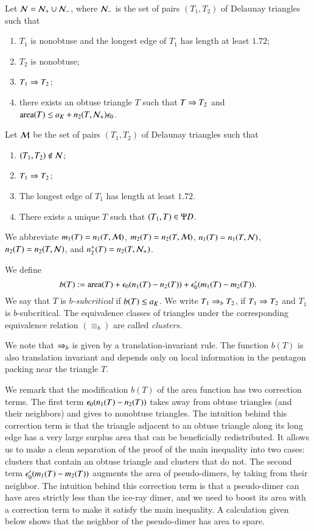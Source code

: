 Let $\mathcal N = \mathcal N_+ \cup \mathcal N_-$, where $\mathcal N_-$ is the set of pairs $(T_1,T_2)$ of Delaunay triangles such that
\begin{enumerate}
\item $T_1$ is nonobtuse and the longest edge of $T_1$ has length at least $1.72$;
\item $T_2$ is nonobtuse;
\item $T_1\Rightarrow T_2$;
\item there exists an obtuse triangle $T$ such that $T\Rightarrow T_2$ and 
${\operatorname{area}}(T) \le a_K+  n_2(T,\mathcal N_+)\epsilon_0$.
\end{enumerate}

Let $\mathcal M$ be the set of pairs $(T_1,T_2)$ of Delaunay triangles such that
\begin{enumerate}
\item $(T_1,T_2)\not\in \mathcal N$;
\item $T_1\Rightarrow T_2$;
\item The longest edge of $T_1$ has length  at least $1.72$.
\item There exists a unique $T$ such that $(T_1,T)\in \Psi D$.
\end{enumerate}

We abbreviate $m_1(T) = n_1(T,\mathcal M)$, $m_2(T) = n_2(T,\mathcal M)$, $n_1(T) = n_1(T,\mathcal N)$, $n_2(T) = n_2(T,\mathcal N)$,
and $n_2^+(T) = n_2(T,\mathcal N_+)$.

We define
\[
b(T) := {\operatorname{area}}(T) + \epsilon_0 (n_1(T) - n_2(T)) + \epsilon_0' (m_1(T) - m_2(T)).
\]
We say that $T$ is {\it $b$-subcritical} if $b(T) \le a_K$.  We write
$T_1\Rightarrow_{b} T_2$, if $T_1\Rightarrow T_2$ and $T_1$ is $b$-subcritical.
The equivalence classes of triangles under the corresponding
equivalence relation $(\equiv_b)$ are called {\it clusters}.

We note that $\Rightarrow_{b}$ is given by a translation-invariant rule.  The function $b(T)$ is also
translation invariant and depends only on local information in the pentagon packing near  the triangle $T$.

We remark that the modification $b(T)$ of the area function has two correction terms.
The first term $\epsilon_0 (n_1(T) - n_2(T))$ takes away from obtuse triangles (and their neighbors) and gives 
 to nonobtuse triangles.  
The intuition behind this correction term is that the triangle adjacent to an obtuse triangle along its long edge
has a very large surplus area that can be beneficially redistributed.  It allows us to make a clean separation of
the proof of the main inequality into two cases: clusters that contain an obtuse triangle and clusters that do not.
The second term $\epsilon_0' (m_1(T) - m_2(T))$ augments the area of pseudo-dimers, by taking from
their neighbor.   The intuition behind this correction term is that a pseudo-dimer can have area strictly less than
the ice-ray dimer, and we need to boost its area with a correction term to make it satisfy the main
inequality.  A calculation given below shows that the neighbor of the pseudo-dimer has area to spare.

